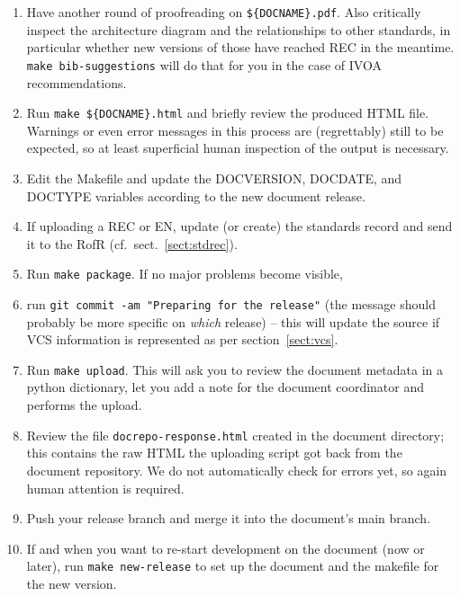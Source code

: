 \documentclass[11pt,a4paper]{ivoa}
\begin{document}
\begin{enumerate}
\item Have another round of proofreading on \verb|${DOCNAME}.pdf|.  Also
critically inspect the architecture diagram and the relationships to
other standards, in particular whether new versions of those have
reached REC in the meantime. \verb|make bib-suggestions| will do
that for you in the case of IVOA recommendations.

\item Run \verb|make ${DOCNAME}.html| and briefly review the produced
HTML file.  Warnings or even error messages in this process are
(regrettably) still to be expected, so at least superficial human inspection
of the output is necessary.

\item Edit the Makefile and update the DOCVERSION, DOCDATE, and DOCTYPE
variables according to the new document release.

\item If uploading a REC or EN, update (or create) the standards record
and send it to the RofR (cf.~sect.~\ref{sect:stdrec}).

\item Run \verb|make package|.  If no major problems become visible,

\item run \verb|git commit -am "Preparing for the release"| (the message
should probably be more specific on \textit{which} release) -- this
will update the source if VCS information is represented as per
section~\ref{sect:vcs}.

\item Run \verb|make upload|.  This will ask you to review the document
metadata in a python dictionary, let you add a note for the document
coordinator and performs the upload.

\item Review the file \texttt{docrepo-response.html} created in the
document directory; this contains the raw HTML the uploading script got
back from the document repository.  We do not automatically check for
errors yet, so again human attention is required.

\item Push your release branch and merge it into the document's main
branch.

\item If and when you want to re-start development on the document (now or
later), run \verb|make new-release| to set up the document and the
makefile for the new version.
\end{enumerate}
\end{document}
